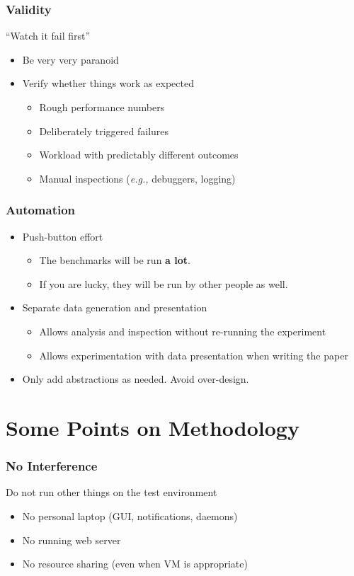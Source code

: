 \documentclass[xcolor={dvipsnames},aspectratio=149]{beamer}
\def\eg{\emph{e.g.,}\xspace}
\begin{document}
\begin{frame}
  \frametitle{Validity}
  ``Watch it fail first''
  \begin{itemize}
  \item Be very very paranoid
  \item Verify whether things work as expected
    \begin{itemize}
    \item Rough performance numbers
    \item Deliberately triggered failures
    \item Workload with predictably different outcomes
    \item Manual inspections (\eg debuggers, logging)
    \end{itemize}
  \end{itemize}
\end{frame}

\begin{frame}
  \frametitle{Automation}
  \begin{itemize}
  \item Push-button effort
    \begin{itemize}
    \item The benchmarks will be run \textbf{a lot}.
    \item If you are lucky, they will be run by other people as well.
    \end{itemize}
  \item Separate data generation and presentation
    \begin{itemize}
    \item Allows analysis and inspection without re-running the experiment
    \item Allows experimentation with data presentation when writing the paper
    \end{itemize}
  \item Only add abstractions as needed. Avoid over-design.
  \end{itemize}
\end{frame}

\section{Some Points on Methodology}
\begin{frame}
  \frametitle{No Interference}
  Do not run other things on the test environment
  \begin{itemize}
  \item No personal laptop (GUI, notifications, daemons)
  \item No running web server
  \item No resource sharing (even when VM is appropriate)
  \end{itemize}
\end{frame}
\end{document}
